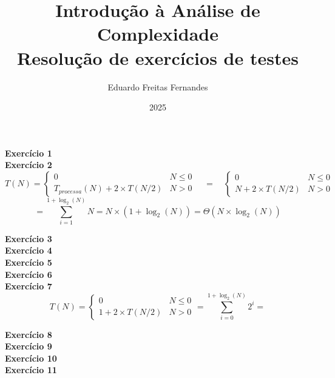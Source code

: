 \documentclass[a4paper,11pt]{article}
\title{Introdução à Análise de Complexidade\\ Resolução de exercícios de testes}
\author{Eduardo Freitas Fernandes}
\date{2025}
\begin{document}
	
	\maketitle
	
	\noindent \textbf{Exercício 1}\\
	
	\noindent \textbf{Exercício 2}\\
	\[
		T(N) = 
		\begin{cases}
			0 & N \leq 0 \\
			T_{processa}(N) + 2 \times T(N/2) & N > 0
		\end{cases}
		\quad = \quad
		\begin{cases}
			0 & N \leq 0 \\
			N + 2 \times T(N/2) & N > 0
		\end{cases}
	\]
	\[
		= \sum_{i=1}^{1+\log_2(N)} N = N \times (1 + \log_2(N)) = \Theta(N \times \log_2(N))
	\]
	
	\noindent \textbf{Exercício 3}\\
	
	\noindent \textbf{Exercício 4}\\
	
	\noindent \textbf{Exercício 5}\\
	
	\noindent \textbf{Exercício 6}\\
	
	\noindent \textbf{Exercício 7}\\
	\[
		T(N) = 
		\begin{cases}
			0 & N \leq 0 \\
			1 + 2 \times T(N/2) & N > 0
		\end{cases}
		= \sum_{i=0}^{1+\log_2(N)} 2^i = 		
	\]

	\noindent \textbf{Exercício 8}\\
	
	\noindent \textbf{Exercício 9}\\
	
	\noindent \textbf{Exercício 10}\\
	
	\noindent \textbf{Exercício 11}\\
	~
\end{document}
